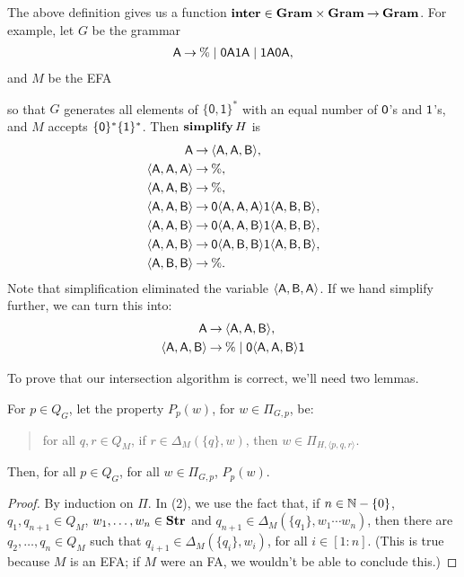 The above definition gives us a function
$\mathbf{inter}\in\mathbf{Gram}\times\mathbf{Gram}\mathbin{\to}\mathbf{Gram}$.  For example, let $G$ be the
%
grammar
\begin{gather*}
  \mathsf{A} \mathbin{\to} \% \mid \mathsf{0A1A} \mid \mathsf{1A0A} ,
\end{gather*}
and $M$ be the EFA
\begin{center}
  
\end{center}
so that $G$ generates all elements of $\{\mathsf{0,1}\}^*$
with an equal number of $\mathsf{0}$'s and $\mathsf{1}$'s, and $M$
accepts $\{\mathsf{0}\}^*\{\mathsf{1}\}^*$.
Then $\mathbf{simplify}\,H$ is
\begin{align*}
\mathsf{A} &\mathbin{\to} \langle\mathsf{A},\mathsf{A},\mathsf{B}\rangle , \\
\langle\mathsf{A},\mathsf{A},\mathsf{A}\rangle &\mathbin{\to} \% , \\
\langle\mathsf{A},\mathsf{A},\mathsf{B}\rangle &\mathbin{\to} \% , \\
\langle\mathsf{A},\mathsf{A},\mathsf{B}\rangle &\mathbin{\to}
\mathsf{0}\langle\mathsf{A},\mathsf{A},\mathsf{A}\rangle\mathsf{1}\langle\mathsf{A},\mathsf{B},\mathsf{B}\rangle , \\
\langle\mathsf{A},\mathsf{A},\mathsf{B}\rangle &\mathbin{\to}
\mathsf{0}\langle\mathsf{A},\mathsf{A},\mathsf{B}\rangle\mathsf{1}\langle\mathsf{A},\mathsf{B},\mathsf{B}\rangle , \\
\langle\mathsf{A},\mathsf{A},\mathsf{B}\rangle &\mathbin{\to}
\mathsf{0}\langle\mathsf{A},\mathsf{B},\mathsf{B}\rangle\mathsf{1}\langle\mathsf{A},\mathsf{B},\mathsf{B}\rangle , \\
\langle\mathsf{A},\mathsf{B},\mathsf{B}\rangle &\mathbin{\to} \% .
\end{align*}
Note that simplification eliminated the variable
$\langle\mathsf{A},\mathsf{B},\mathsf{A}\rangle$.
If we hand simplify further, we can turn this into:
\begin{align*}
\mathsf{A} &\mathbin{\to} \langle\mathsf{A},\mathsf{A},\mathsf{B}\rangle , \\
\langle\mathsf{A},\mathsf{A},\mathsf{B}\rangle &\mathbin{\to}
\% \mid \mathsf{0}\langle\mathsf{A},\mathsf{A},\mathsf{B}\rangle\mathsf{1}
\end{align*}

To prove that our intersection algorithm is correct, we'll need two
lemmas.

\begin{lemma}
\label{GramEFAInter1}
For $p\in Q_G$, let the property $P_p(w)$, for $w\in\Pi_{G,p}$, be:
\begin{quotation}
\noindent
for all $q,r\in Q_M$, if $r\in\Delta_M(\{q\},w)$, then
$w\in\Pi_{H,\langle p, q, r\rangle}$.
\end{quotation}
Then, for all $p\in Q_G$, for all $w\in\Pi_{G,p}$, $P_p(w)$.
\end{lemma}

\begin{proof}
By induction on $\Pi$. In (2), we use the fact that, if
$n\in\mathbb{N}-\{0\}$, $q_1,q_{n+1}\in Q_M$,
$w_1,\ldots,w_n\in\mathbf{Str}$ and
$q_{n+1}\in\Delta_M(\{q_1\}, w_1\cdots w_n)$, then
there are $q_2,\ldots,q_n\in Q_M$ such that
$q_{i+1}\in\Delta_M(\{q_i\}, w_i)$, for all $i\in[1:n]$. (This is
true because $M$ is an EFA; if $M$ were an FA, we wouldn't be able to
conclude this.)
\end{proof}

